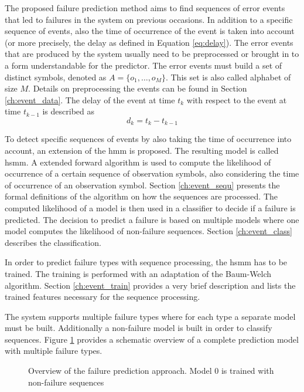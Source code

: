 \documentclass[mscthesis]{usiinfthesis}
\begin{document}
The proposed failure prediction method aims to find sequences of error events
that led to failures in the system on previous occasions. In addition to
a specific sequence of events, also the time of occurrence of the event is taken
into account (or more precisely, the delay as defined in Equation
\ref{eq:delay}). The error events that are produced by the system usually need
to be preprocessed or brought in to a form understandable for the predictor.
The error events must build a set of distinct symbols, denoted as $A=\{o_1,
\dots, o_M\}$. This set is also called alphabet of size $M$. Details on
preprocessing the events can be found in Section \ref{ch:event_data}. The
delay of the event at time $ t_k $ with respect to the event at time $ t_{k-1}
$ is described as
\begin{equation}
\label{eq:delay}
    d_k = t_k-t_{k-1}
\end{equation}

To detect specific sequences of events by also taking the time of occurrence
into account, an extension of the \gls{hmm} is proposed. The resulting model is
called \acrfull{hsmm}. A extended forward algorithm is used to compute the
likelihood of occurrence of a certain sequence of observation symbols, also
considering the time of occurrence of an observation symbol. Section
\ref{ch:event_sequ} presents the formal definitions of the algorithm on how the
sequences are processed. The computed likelihood of a model is then used in
a classifier to decide if a failure is predicted. The decision to predict
a failure is based on multiple models where one model computes the likelihood
of non-failure sequences. Section \ref{ch:event_class} describes the
classification.

In order to predict failure types with sequence processing, the \gls{hsmm} has
to be trained. The training is performed with an adaptation of the Baum-Welch
algorithm. Section \ref{ch:event_train} provides a very brief description and
lists the trained features necessary for the sequence processing.

The system supports multiple failure types where for each type a separate
model must be built. Additionally a non-failure model is built in order to
classify sequences. Figure \ref{fig:model} provides a schematic overview of
a complete prediction model with multiple failure types.

\begin{figure}
    \centering
    
    \caption{Overview of the failure prediction approach. Model 0 is trained
        with non-failure sequences}
    \label{fig:model}
\end{figure}
\end{document}
